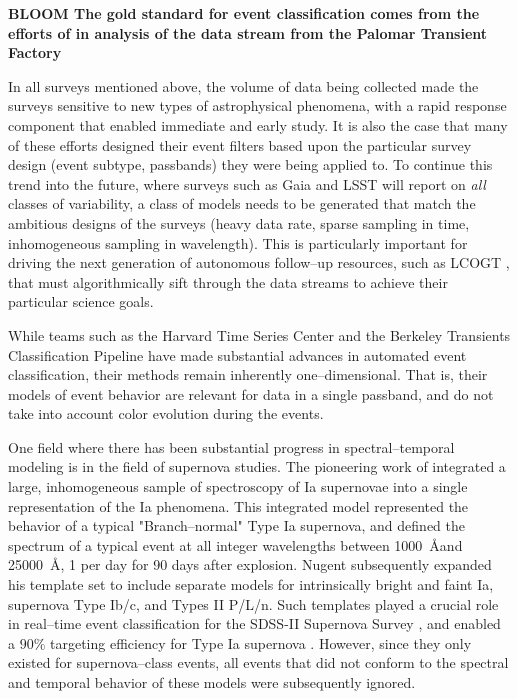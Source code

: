 
{\bf BLOOM The gold standard for event classification comes from the efforts of
\cite{X} in analysis of the data stream from the Palomar Transient Factory
\citep{X}}

In all surveys mentioned above, the volume of data being collected made the
surveys sensitive to new types of astrophysical phenomena, with a rapid response
component that enabled immediate and early study.  It is also the case that many
of these efforts designed their event filters based upon the particular survey
design (event subtype, passbands) they were being applied to.  To continue this
trend into the future, where surveys such as Gaia \citep{X} and LSST \citep{X}
will report on {\it all} classes of variability, a class of models needs to be
generated that match the ambitious designs of the surveys (heavy data rate,
sparse sampling in time, inhomogeneous sampling in wavelength).  This is
particularly important for driving the next generation of autonomous follow--up
resources, such as LCOGT \citep{2008AN....329..269H}, that must algorithmically
sift through the data streams to achieve their particular science goals.

 \smallskip

While teams such as the Harvard Time Series Center \citep{} and the Berkeley
Transients Classification Pipeline \citep{} have made substantial advances in
automated event classification, their methods remain inherently
one--dimensional. That is, their models of event behavior are relevant for data
in a single passband, and do not take into account color evolution during the
events.

One field where there has been substantial progress in spectral--temporal
modeling is in the field of supernova studies. The pioneering work of
\cite{2002PASP..114..803N} integrated a large, inhomogeneous sample of
spectroscopy of Ia supernovae into a single representation of the Ia phenomena.
This integrated model represented the behavior of a typical "Branch--normal"
Type Ia supernova, and defined the spectrum of a typical event at all integer
wavelengths between 1000~\AA and 25000~\AA, 1 per day for 90 days after
explosion.  Nugent subsequently expanded his template set to include separate
models for intrinsically bright and faint Ia, supernova Type Ib/c, and Types II
P/L/n. Such templates played a crucial role in real--time event classification
for the SDSS-II Supernova Survey \citep{2008AJ....135..338F}, and enabled a
$90\%$ targeting efficiency for Type Ia supernova \citep{2008AJ....135..348S}.
However, since they only existed for supernova--class events, all events that
did not conform to the spectral and temporal behavior of these models were
subsequently ignored.

